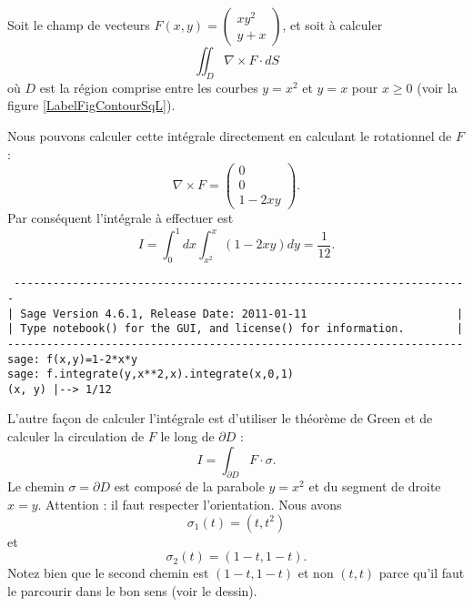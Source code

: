 \begin{example}     \label{ExempleGreenSqL}
    Soit le champ de vecteurs $F(x,y)=\begin{pmatrix}
        xy^2    \\ 
        y+x    
    \end{pmatrix}$, et soit à calculer
    \begin{equation}
        \iint_D\nabla\times F\cdot dS
    \end{equation}
    où $D$ est la région comprise entre les courbes $y=x^2$ et $y=x$ pour $x\geq 0$ (voir la figure \ref{LabelFigContourSqL}).
    \newcommand{\CaptionFigContourSqL}{Le contour d'intégration pour l'exemple \ref{ExempleGreenSqL}.}
    

    Nous pouvons calculer cette intégrale directement en calculant le rotationnel de $F$:
    \begin{equation}
        \nabla\times F=\begin{pmatrix}
            0    \\ 
            0    \\ 
            1-2xy    
        \end{pmatrix}.
    \end{equation}
    Par conséquent l'intégrale à effectuer est
    \begin{equation}
        I=\int_0^1 dx\int_{x^2}^x(1-2xy)dy=\frac{1}{ 12 }.
    \end{equation}
    \begin{verbatim}
 ----------------------------------------------------------------------
| Sage Version 4.6.1, Release Date: 2011-01-11                       |
| Type notebook() for the GUI, and license() for information.        |
----------------------------------------------------------------------
sage: f(x,y)=1-2*x*y
sage: f.integrate(y,x**2,x).integrate(x,0,1)
(x, y) |--> 1/12
    \end{verbatim}
    
    L'autre façon de calculer l'intégrale est d'utiliser le théorème de Green et de calculer la circulation de $F$ le long de $\partial D$ :
    \begin{equation}
        I=\int_{\partial D}F\cdot \sigma.
    \end{equation}
    Le chemin $\sigma=\partial D$ est composé de la parabole $y=x^2$ et du segment de droite $x=y$. Attention : il faut respecter l'orientation. Nous avons
    \begin{equation}
        \sigma_1(t)=(t,t^2)
    \end{equation}
    et
    \begin{equation}
        \sigma_2(t)=(1-t,1-t).
    \end{equation}
    Notez bien que le second chemin est $(1-t,1-t)$ et non $(t,t)$ parce qu'il faut le parcourir dans le bon sens (voir le dessin).


\end{example}

